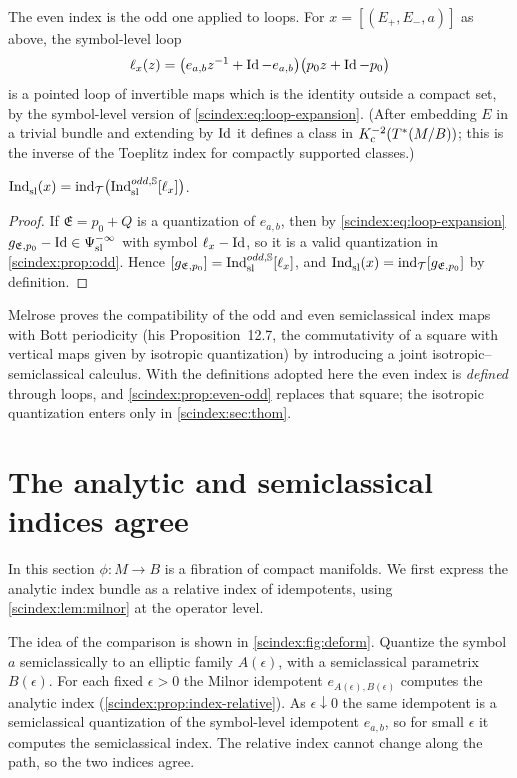 The even index is the odd one applied to loops. For $x=[(E_+,E_-,a)]$ as above,
the symbol-level loop
\begin{equation}\label{scindex:eq:symbol-loop}
  \ell_x(z)=\bigl(e_{a,b}z^{-1}+\operatorname{Id}-e_{a,b}\bigr)\bigl(p_0z+\operatorname{Id}-p_0\bigr)
\end{equation}
is a pointed loop of invertible maps which is the identity outside a compact set,
by the symbol-level version of \eqref{scindex:eq:loop-expansion}. (After
embedding $E$ in a trivial bundle and extending by $\operatorname{Id}$ it defines a class in
$K_{\mathrm{c}}^{-2}(T^*(M/B))$; this is the inverse of the Toeplitz index for compactly
supported classes.)

\begin{proposition}\label{scindex:prop:even-odd}
  $\operatorname{Ind}^{}_{\mathrm{sl}}(x)=\operatorname{ind}_{\mathcal T}\bigl(\operatorname{Ind}^{odd,\mathbb{S}}_{\mathrm{sl}}[\ell_x]\bigr)$.
\end{proposition}
\begin{proof}
  If $\mathfrak E=p_0+Q$ is a quantization of $e_{a,b}$, then by
  \eqref{scindex:eq:loop-expansion} $g_{\mathfrak E,p_0}-\operatorname{Id}\in\Psi^{-\infty}_{\mathrm{sl}}$
  with symbol $\ell_x-\operatorname{Id}$, so it is a valid quantization in
  \cref{scindex:prop:odd}. Hence $[g_{\mathfrak E,p_0}]=\operatorname{Ind}^{odd,\mathbb{S}}_{\mathrm{sl}}[\ell_x]$, and
  $\operatorname{Ind}^{}_{\mathrm{sl}}(x)=\operatorname{ind}_{\mathcal T}[g_{\mathfrak E,p_0}]$ by definition.
\end{proof}

\begin{remark}\label{scindex:rem:suspension}
  Melrose proves the compatibility of the odd and even semiclassical index maps
  with Bott periodicity (his Proposition~12.7, the commutativity of a square with
  vertical maps given by isotropic quantization) by introducing a joint
  isotropic--semiclassical calculus. With the definitions adopted here the even
  index is \emph{defined} through loops, and \cref{scindex:prop:even-odd} replaces
  that square; the isotropic quantization enters only in
  \cref{scindex:sec:thom}.
\end{remark}

\section{The analytic and semiclassical indices agree}\label{scindex:sec:analytic}

In this section $\phi:M\to B$ is a fibration of compact manifolds. We first
express the analytic index bundle as a relative index of idempotents, using
\cref{scindex:lem:milnor} at the operator level.

\begin{discussion}
  The idea of the comparison is shown in \cref{scindex:fig:deform}. Quantize
  the symbol $a$ semiclassically to an elliptic family $A(\epsilon)$, with a
  semiclassical parametrix $B(\epsilon)$. For each fixed $\epsilon>0$ the Milnor
  idempotent $e_{A(\epsilon),B(\epsilon)}$ computes the analytic index
  (\cref{scindex:prop:index-relative}). As $\epsilon\downarrow0$ the same
  idempotent is a semiclassical quantization of the symbol-level idempotent
  $e_{a,b}$, so for small $\epsilon$ it computes the semiclassical index. The
  relative index cannot change along the path, so the two indices agree.
\end{discussion}

